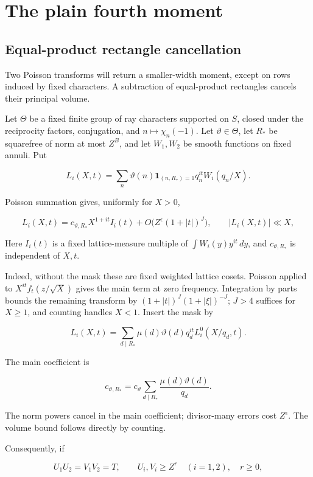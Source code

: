 \documentclass[11pt,a4paper]{article}
\begin{document}
\section{The plain fourth moment}\label{sec:D}

\subsection{Equal-product rectangle cancellation}\label{sec:D.1}

Two Poisson transforms will return a smaller-width moment, except on rows induced by fixed characters. A subtraction of equal-product rectangles cancels their principal volume.

Let \(\Theta\) be a fixed finite group of ray characters supported on \(S\), closed under the reciprocity factors, conjugation, and \(n\mapsto\chi_n(-1)\). Let \(\vartheta\in\Theta\), let \(R_*\) be squarefree of norm at most \(Z^B\), and let \(W_1,W_2\) be smooth functions on fixed annuli. Put

\[
L_i(X,t)=\sum_n\vartheta(n)\mathbf1_{(n,R_*)=1}q_n^{it}W_i(q_n/X).
\]

Poisson summation gives, uniformly for \(X>0\),

\[
L_i(X,t)=c_{\vartheta,R_*}X^{1+it}I_i(t)
 +O\bigl(Z^\epsilon(1+|t|)^J\bigr),\qquad |L_i(X,t)|\ll X,
\tag{D.1}\label{eq:D.1}
\]

Here \(I_i(t)\) is a fixed lattice-measure multiple of \(\int W_i(y)y^{it}\,dy\), and \(c_{\vartheta,R_*}\) is independent of \(X,t\).

Indeed, without the mask these are fixed weighted lattice cosets. Poisson applied to \(X^{it}f_t(z/\sqrt X)\) gives the main term at zero frequency. Integration by parts bounds the remaining transform by \((1+|t|)^J(1+|\xi|)^{-J}\); \(J>4\) suffices for \(X\ge1\), and counting handles \(X<1\). Insert the mask by

\[
L_i(X,t)=\sum_{d\mid R_*}\mu(d)\vartheta(d)q_d^{it}L_i^0(X/q_d,t).
\]

The main coefficient is

\[
c_{\vartheta,R_*}=c_\vartheta\sum_{d\mid R_*}\frac{\mu(d)\vartheta(d)}{q_d}.
\]

The norm powers cancel in the main coefficient; divisor-many errors cost \(Z^\epsilon\). The volume bound follows directly by counting.

Consequently, if

\[
U_1U_2=V_1V_2=T,\qquad U_i,V_i\ge Z^r\quad(i=1,2),\quad r\ge0,
\]
\end{document}
